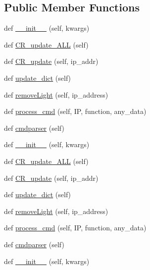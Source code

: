 \subsection*{Public Member Functions}
\begin{DoxyCompactItemize}
\item 
def \hyperlink{classTestingGUI_1_1Methods_a6b7453ea737e1e8b53e33f999d0c9f2a}{\+\_\+\+\_\+init\+\_\+\+\_\+} (self, kwargs)
\item 
def \hyperlink{classTestingGUI_1_1Methods_a7caae1065692f63bf28b64e8f7c0709b}{C\+R\+\_\+update\+\_\+\+A\+LL} (self)
\item 
def \hyperlink{classTestingGUI_1_1Methods_a9c1aa20eca768d36ff23c118e35052eb}{C\+R\+\_\+update} (self, ip\+\_\+addr)
\item 
def \hyperlink{classTestingGUI_1_1Methods_a0709231f5f6f33c59ce325c7e3ebf156}{update\+\_\+dict} (self)
\item 
def \hyperlink{classTestingGUI_1_1Methods_adcf75d9e2ac64426a6f46e7797d221c0}{remove\+Light} (self, ip\+\_\+address)
\item 
def \hyperlink{classTestingGUI_1_1Methods_a5313fe533c054cf6077aeb101de8e73b}{process\+\_\+cmd} (self, IP, function, any\+\_\+data)
\item 
def \hyperlink{classTestingGUI_1_1Methods_aefc0f91f471aeef7ee76a5ad85ad8afc}{cmdparser} (self)
\item 
def \hyperlink{classTestingGUI_1_1Methods_a6b7453ea737e1e8b53e33f999d0c9f2a}{\+\_\+\+\_\+init\+\_\+\+\_\+} (self, kwargs)
\item 
def \hyperlink{classTestingGUI_1_1Methods_a7caae1065692f63bf28b64e8f7c0709b}{C\+R\+\_\+update\+\_\+\+A\+LL} (self)
\item 
def \hyperlink{classTestingGUI_1_1Methods_a9c1aa20eca768d36ff23c118e35052eb}{C\+R\+\_\+update} (self, ip\+\_\+addr)
\item 
def \hyperlink{classTestingGUI_1_1Methods_a0709231f5f6f33c59ce325c7e3ebf156}{update\+\_\+dict} (self)
\item 
def \hyperlink{classTestingGUI_1_1Methods_adcf75d9e2ac64426a6f46e7797d221c0}{remove\+Light} (self, ip\+\_\+address)
\item 
def \hyperlink{classTestingGUI_1_1Methods_a5313fe533c054cf6077aeb101de8e73b}{process\+\_\+cmd} (self, IP, function, any\+\_\+data)
\item 
def \hyperlink{classTestingGUI_1_1Methods_aefc0f91f471aeef7ee76a5ad85ad8afc}{cmdparser} (self)
\item 
def \hyperlink{classTestingGUI_1_1Methods_a6b7453ea737e1e8b53e33f999d0c9f2a}{\+\_\+\+\_\+init\+\_\+\+\_\+} (self, kwargs)

\end{DoxyCompactItemize}
